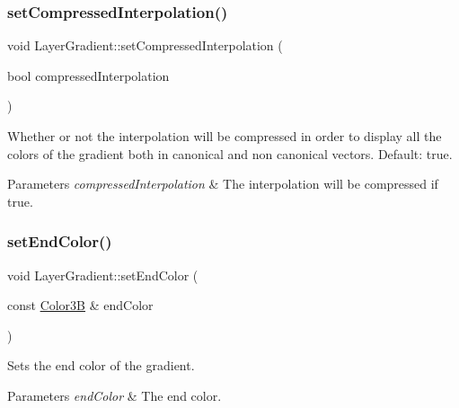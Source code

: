\subsubsection{\texorpdfstring{set\+Compressed\+Interpolation()}{setCompressedInterpolation()}\hspace{0.1cm}{\footnotesize\ttfamily [2/2]}}
{\footnotesize\ttfamily void Layer\+Gradient\+::set\+Compressed\+Interpolation (\begin{DoxyParamCaption}\item[{bool}]{compressed\+Interpolation }\end{DoxyParamCaption})}

Whether or not the interpolation will be compressed in order to display all the colors of the gradient both in canonical and non canonical vectors. Default\+: true.


\begin{DoxyParams}{Parameters}
{\em compressed\+Interpolation} & The interpolation will be compressed if true. \\
\hline
\end{DoxyParams}
\mbox{\label{classLayerGradient_a77846684f7babd57ee10cd96d3f3dd21}} 
\subsubsection{\texorpdfstring{set\+End\+Color()}{setEndColor()}\hspace{0.1cm}{\footnotesize\ttfamily [1/2]}}
{\footnotesize\ttfamily void Layer\+Gradient\+::set\+End\+Color (\begin{DoxyParamCaption}\item[{const \hyperlink{structColor3B}{Color3B} \&}]{end\+Color }\end{DoxyParamCaption})}

Sets the end color of the gradient.


\begin{DoxyParams}{Parameters}
{\em end\+Color} & The end color. \\
\hline
\end{DoxyParams}
\mbox{\label{classLayerGradient_a77846684f7babd57ee10cd96d3f3dd21}} 
